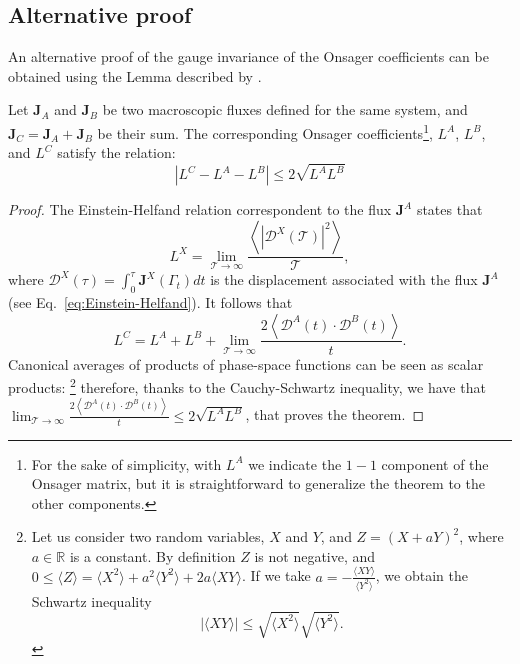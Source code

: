 \subsection{Alternative proof}
\begin{LEtext}
An alternative proof of the gauge invariance of the Onsager coefficients can be obtained using the Lemma described by \citet{Marcolongo2016}.
\begin{theorem} \label{th:aris-theorem}
Let $\mathbf{J}_A$ and $\mathbf{J}_B$ be two macroscopic fluxes defined for the same system, and  $\mathbf{J}_{C} = \mathbf{J}_A + \mathbf{J}_B$ be their sum. The corresponding Onsager coefficients\footnote{For the sake of simplicity, with $L^A$ we indicate the $1-1$ component of the Onsager matrix, but it is straightforward to generalize the theorem to the other components.}, $L^{A}$, $L^{B}$, and $L^{C}$ satisfy the relation:
\begin{equation} \label{eq:aris-theorem}
    \left| L^{C} - L^{A} - L^{B} \right| \leq 2 \sqrt{L^{A} L^{B}}
\end{equation}
\end{theorem}
\begin{proof}
The Einstein-Helfand relation correspondent to the flux $\mathbf{J}^A$ states that 
\begin{equation}
    L^{X} = \lim_{\mathcal{T}\rightarrow\infty} \frac{\left\langle|\mathcal{D}^X(\mathcal{T})|^2\right\rangle} {\mathcal{T}},
\end{equation}
where $\mathcal{D}^X(\tau)=\int_0^\tau \mathbf{J}^X(\Gamma_t) dt$ is the displacement associated with the flux $\mathbf{J}^A$ (see Eq.~\eqref{eq:Einstein-Helfand}). It follows that 
\begin{equation}
    L^{C} = L^{A} + L^{B} + \lim_{\mathcal{T}\rightarrow\infty} \frac{2\left\langle \mathcal{D}^A(t) \cdot \mathcal{D}^B(t)\right\rangle} {t}.
\end{equation}
Canonical averages of products of phase-space functions can be seen as scalar products:
\footnote{Let us consider two random variables, $X$ and $Y$, and $Z=(X+aY)^2$, where $a\in \mathbb{R}$ is a constant. By definition $Z$ is not negative, and $0\leq \langle Z \rangle = \langle X^2 \rangle + a^2 \langle Y^2 \rangle + 2a \langle XY \rangle$. If we take $a = -\frac{\langle XY \rangle}{\langle Y^2 \rangle}$, we obtain the Schwartz inequality
\begin{equation} \label{eq:schwartz-ineq}
    |\langle XY \rangle| \leq \sqrt{\langle X^2 \rangle} \sqrt{\langle Y^2 \rangle}.
\end{equation}}
therefore, thanks to the Cauchy-Schwartz inequality, we have that $\lim_{\mathcal{T}\rightarrow\infty} \frac{2\left\langle \mathcal{D}^A(t) \cdot \mathcal{D}^B(t)\right\rangle} {t} \leq 2\sqrt{L^{A} L^{B}}$, that proves the theorem. 
\end{proof}


\end{LEtext}
